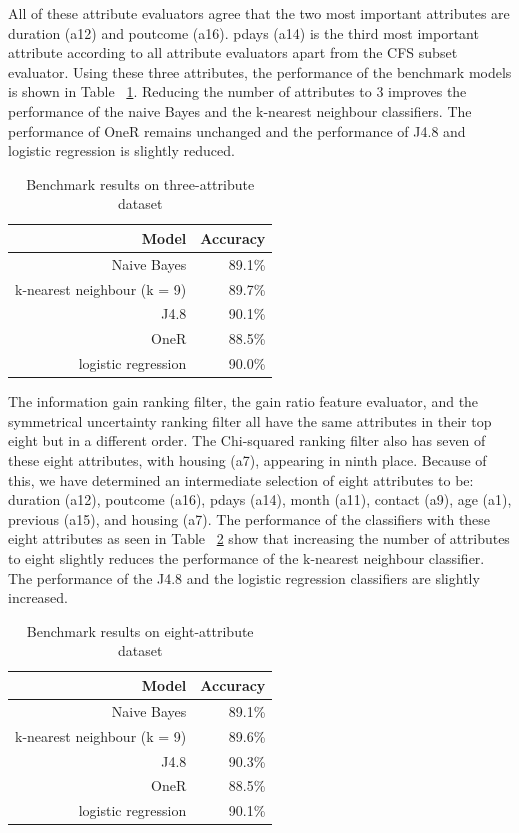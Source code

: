 \documentclass[a4paper,11pt]{article}
\begin{document}
All of these attribute evaluators agree that the two most important attributes are duration (a12) and poutcome (a16).
pdays (a14) is the third most important attribute according to all attribute evaluators apart from the CFS subset 
evaluator. Using these three attributes, the performance of the benchmark models is shown in Table ~\ref{tab:topThreeBenchmark}. 
Reducing the number of attributes to 3 improves the performance of the naive Bayes and the k-nearest neighbour classifiers. 
The performance of OneR remains unchanged and the performance of J4.8 and logistic regression is slightly reduced. 

\begin{table}[H]
  \begin{center}
    \begin{tabular}{r | r}
      Model & Accuracy  \\ \hline
      Naive Bayes & 89.1\% \\
      k-nearest neighbour (k = 9) & 89.7\% \\
      J4.8 & 90.1\% \\
      OneR & 88.5\% \\
      logistic regression & 90.0\% \\
    \end{tabular}
  \end{center}
  \caption{Benchmark results on three-attribute dataset}
  \label{tab:topThreeBenchmark}
\end{table}

The information gain ranking filter, the gain ratio feature evaluator, and the symmetrical uncertainty ranking
filter all have the same attributes in their top eight but in a different order. The Chi-squared ranking filter
also has seven of these eight attributes, with housing (a7), appearing in ninth place.
Because of this, we have determined an intermediate selection of eight attributes to be: 
duration (a12), poutcome (a16), pdays (a14), month (a11), contact (a9), age (a1), previous (a15), and housing (a7).
The performance of the classifiers with these eight attributes as seen in Table ~\ref{tab:topEightBenchmark} show
that increasing the number of attributes to eight slightly reduces the performance of the k-nearest neighbour
classifier. The performance of the J4.8 and the logistic regression classifiers are slightly increased. 

\begin{table}[H]
  \begin{center}
    \begin{tabular}{r | r}
      Model & Accuracy  \\ \hline
      Naive Bayes & 89.1\% \\
      k-nearest neighbour (k = 9) & 89.6\% \\
      J4.8 & 90.3\% \\
      OneR & 88.5\% \\
      logistic regression & 90.1\% \\
    \end{tabular}
  \end{center}
  \caption{Benchmark results on eight-attribute dataset}
  \label{tab:topEightBenchmark}
\end{table}
\end{document}

